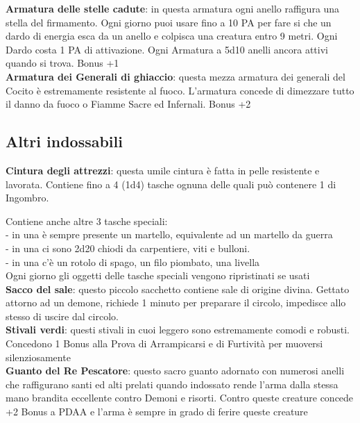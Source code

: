 \documentclass[a4paper,twoside,openany]{book}
\begin{document}
\begin{multicols}{2}
\textbf{Armatura delle stelle cadute}: in questa armatura ogni anello raffigura una stella del firmamento. Ogni giorno puoi usare fino a 10 PA per fare si che un dardo di energia esca da un anello e colpisca una creatura entro 9 metri. Ogni Dardo costa 1 PA di attivazione. Ogni Armatura a 5d10 anelli ancora attivi quando si trova. Bonus +1\\

\textbf{Armatura dei Generali di ghiaccio}: questa mezza armatura dei generali del Cocito è estremamente resistente al fuoco. L'armatura concede di dimezzare tutto il danno da fuoco o Fiamme Sacre ed Infernali. Bonus +2

\subsection{Altri indossabili}
\textbf{Cintura degli attrezzi}: questa umile cintura è fatta in pelle resistente e lavorata. Contiene fino a 4 (1d4) tasche ognuna delle quali può contenere 1 di Ingombro.

Contiene anche altre 3 tasche speciali:\\
- in una è sempre presente un martello, equivalente ad un martello da guerra\\
- in una ci sono 2d20 chiodi da carpentiere, viti e bulloni. \\
- in una c'è un rotolo di spago, un filo piombato, una livella\\
Ogni giorno gli oggetti delle tasche speciali vengono ripristinati se usati\\

\textbf{Sacco del sale}: questo piccolo sacchetto contiene sale di origine divina. Gettato attorno ad un demone, richiede 1 minuto per preparare il circolo, impedisce allo stesso di uscire dal circolo.\\

\textbf{Stivali verdi}: questi stivali in cuoi leggero sono estremamente comodi e robusti. Concedono 1 Bonus alla Prova di Arrampicarsi e di Furtività per muoversi silenziosamente\\

\textbf{Guanto del Re Pescatore}: questo sacro guanto adornato con numerosi anelli che raffigurano santi ed alti prelati quando indossato rende l'arma dalla stessa mano brandita eccellente contro Demoni e risorti. Contro queste creature concede +2 Bonus a PDAA e l'arma è sempre in grado di ferire queste creature\\


\end{multicols}
\end{document}
